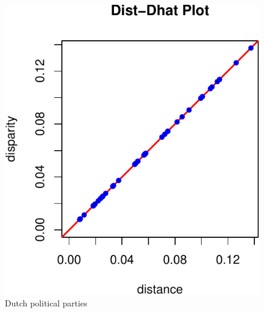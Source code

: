 \documentclass[
  12pt,
]{article}
\begin{document}
\begin{figure}

{\centering \includegraphics{smacofPC_files/figure-latex/partiesdd-1} 

}

\caption{Dutch political parties}\label{fig:partiesdd}
\end{figure}
\end{document}
